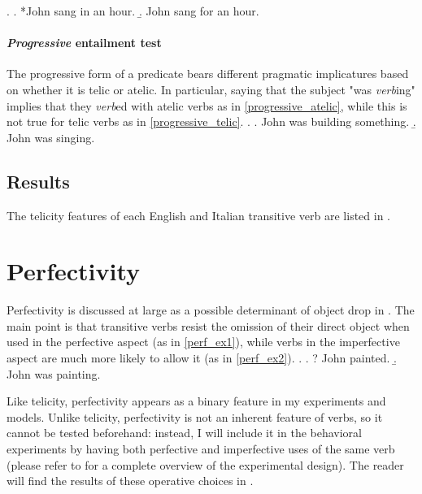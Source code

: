 \ex. \label{infor_atelic} \a. *John sang in an hour.
\b. John sang for an hour.

\paragraph{\textit{Progressive} entailment test} The progressive form of a predicate bears different pragmatic implicatures based on whether it is telic or atelic. In particular, saying that the subject "was \textit{verb}ing" implies that they \textit{verb}ed with atelic verbs as in \ref{progressive_atelic}, while this is not true for telic verbs as in \ref{progressive_telic}.
\ex. \a. John was building something. \label{progressive_telic} 
\b. John was singing. \label{progressive_atelic}

\subsection{Results}
The telicity features of each English and Italian transitive verb are listed in .



\section{Perfectivity} 

Perfectivity is discussed at large as a possible determinant of object drop in . The main point is that transitive verbs resist the omission of their direct object when used in the perfective aspect (as in \ref{perf_ex1}), while verbs in the imperfective aspect are much more likely to allow it (as in \ref{perf_ex2}).
\ex.\label{perf_ex} \a. ? John painted. \label{perf_ex1} 
\b. John was painting. \label{perf_ex2}

Like telicity, perfectivity appears as a binary feature in my experiments and models. Unlike telicity, perfectivity is not an inherent feature of verbs, so it cannot be tested beforehand: instead, I will include it in the behavioral experiments by having both perfective and imperfective uses of the same verb (please refer to  for a complete overview of the experimental design). The reader will find the results of these operative choices in .

